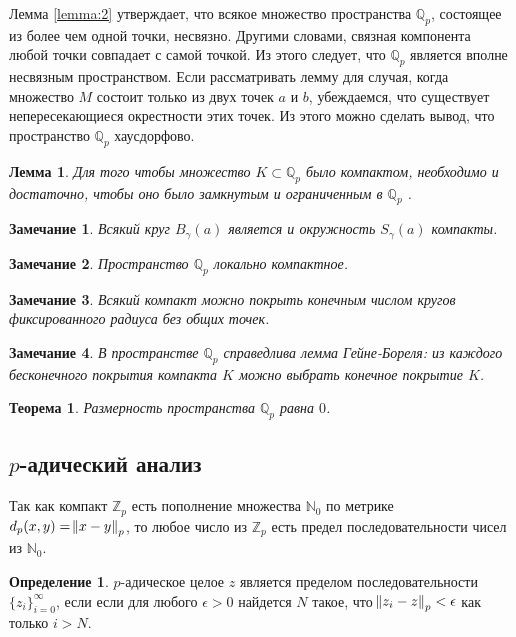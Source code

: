 \documentclass[master, och, diploma, times]{sty/SCWorks}
\theoremstyle{plain}
\newtheorem{thethm}{Теорема}[section]
\newtheorem{lemma}{Лемма}[section]
\newtheorem{note}{Замечание}[section]
\theoremstyle{definition}
\newtheorem{defn}{Определение}[section]
\numberwithin{equation}{section}
\begin{document}
Лемма \eqref{lemma:2} утверждает, что всякое множество пространства $\mathbb {Q}_p$, состоящее из более чем одной точки, несвязно. Другими словами, связная компонента любой точки совпадает с самой точкой. Из этого следует, что $\mathbb {Q}_p$ является вполне несвязным пространством. Если рассматривать лемму для случая, когда множество $M$ состоит только из двух точек $a$ и $b$, убеждаемся, что существует непересекающиеся окрестности этих точек. Из этого можно сделать вывод, что пространство $\mathbb {Q}_p$ хаусдорфово.

\begin{lemma}
Для того чтобы множество $K \subset \mathbb {Q}_p$ было компактом, необходимо и достаточно, чтобы оно было замкнутым и ограниченным в $\mathbb {Q}_p$ \cite{bib:analysis:anashin:3}.
\end{lemma}

\begin{note}
Всякий круг $B_{\gamma}(a)$ является и окружность $S_{\gamma}(a)$ компакты.
\end{note}

\begin{note}
Пространство $\mathbb {Q}_p$ локально компактное.
\end{note}

\begin{note}
Всякий компакт можно покрыть конечным числом кругов фиксированного радиуса без общих точек.
\end{note}

\begin{note}
В пространстве $\mathbb {Q}_p$ справедлива лемма Гейне-Бореля: из каждого бесконечного покрытия компакта $K$ можно выбрать конечное покрытие $K$.
\end{note}

\begin{thethm}
Размерность пространства $\mathbb {Q}_p$ равна $0$.
\end{thethm}

\subsection{$p$-адический анализ}

Так как компакт $\mathbb {Z}_p$ есть пополнение множества $\mathbb {N}_0$ по метрике \linebreak ${d_p(x,y)=\norm{x-y}_p}$, то любое число из $\mathbb {Z}_p$ есть предел последовательности чисел из $\mathbb {N}_0$.

\begin{defn}
$p$-адическое целое $z$ является пределом последовательности $\{z_i\}^{\infty}_{i=0}$, если если для любого $\epsilon > 0$ найдется $N$ такое, что $\norm{z_i-z}_p < \epsilon$ как только $i>N$. \cite{bib:dynamic:anashin:1}
\end{defn}
\end{document}
